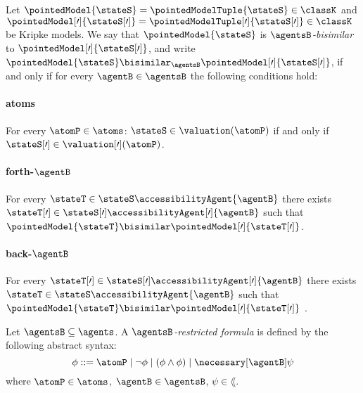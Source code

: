 \documentclass[twoside]{aiml14}
\begin{document}
  \begin{definition}
      Let $\pointedModel{\stateS} = \pointedModelTuple{\stateS} \in \classK$ 
      and $\pointedModel[\prime]{\stateS[\prime]} = \pointedModelTuple[\prime]{\stateS[\prime]} \in \classK$
      be Kripke models. 
      We say that $\pointedModel{\stateS}$ is {\em $\agentsB$-bisimilar}
      to $\pointedModel[\prime]{\stateS[\prime]}$,
      and write $\pointedModel{\stateS} \bisimilar_\agentsB \pointedModel[\prime]{\stateS[\prime]}$,
      if and only if for every $\agentB \in \agentsB$ the following conditions hold:

      \paragraph{atoms}
      For every $\atomP \in \atoms$: $\stateS \in \valuation(\atomP)$ if and only if $\stateS[\prime] \in \valuation[\prime](\atomP)$.

      \paragraph{forth-$\agentB$}
      For every $\stateT \in \stateS \accessibilityAgent{\agentB}$ 
      there exists $\stateT[\prime] \in \stateS[\prime] \accessibilityAgent[\prime]{\agentB}$
      such that $\pointedModel{\stateT} \bisimilar \pointedModel[\prime]{\stateT[\prime]}$.

      \paragraph{back-$\agentB$}
      For every $\stateT[\prime] \in \stateS[\prime] \accessibilityAgent[\prime]{\agentB}$
      there exists $\stateT \in \stateS \accessibilityAgent{\agentB}$ 
      such that $\pointedModel{\stateT} \bisimilar \pointedModel[\prime]{\stateT[\prime]}$ .
  \end{definition}

  \begin{definition}\label{b-restricted-formulae}
      Let $\agentsB \subseteq \agents$. A {\em $\agentsB$-restricted formula} is defined by the following abstract syntax:
      $$
      \phi ::= \atomP \mid
               \neg \phi \mid
               (\phi \land \phi) \mid
               \necessary[\agentB] \psi
      $$
      where $\atomP \in \atoms$, $\agentB \in \agentsB$, $\psi \in \lang$.
  \end{definition}
\end{document}
